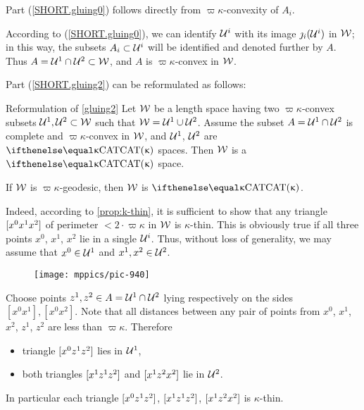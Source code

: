 Part (\ref{SHORT.gluing0})
follows directly from $\varpi\kappa$-convexity of $A_i$.

According to (\ref{SHORT.gluing0}),
we can identify $\mathcal{U}^i$ with its image $\jmath_i(\mathcal{U}^i)$ in $\mathcal{W}$;
in this way, the subsets $A_i\subset \spc{U}^i$ will be identified and denoted further by $A$.
Thus   $A=\spc{U}^1\cap \spc{U}^2\subset \spc{W}$,
and $A$ is $\varpi\kappa$-convex in $\mathcal{W}$.

Part (\ref{SHORT.gluing2}) can be reformulated as follows:

\begin{thm}{Reformulation of \ref{gluing2}}
Let $\mathcal{W}$ be a 
length space having two 
$\varpi\kappa$-convex subsets $\spc{U}^1,\spc{U}^2\subset\spc{W}$ such that
$\spc{W}=\spc{U}^1\cup\spc{U}^2$.
Assume the subset $A=\spc{U}^1\cap \spc{U}^2$ is complete and $\varpi\kappa$-convex in $\mathcal{W}$, and $\mathcal{U}^1$, $\mathcal{U}^2$ are $\CAT\kappa$ spaces.
Then $\mathcal{W}$ is a $\CAT\kappa$ space.
\end{thm}

\begin{clm}{}\label{clm:geod-gluing}
If $\mathcal{W}$ is $\varpi\kappa$-geodesic, then $\mathcal{W}$ is $\CAT\kappa$.
\end{clm}

Indeed, 
according to \ref{prop:k-thin},
it is sufficient to show that any triangle $[{x^0}{x^1}{x^2}]$ of perimeter $<2\cdot \varpi\kappa$ 
in $\mathcal{W}$ is $\kappa$-thin.
This is obviously true if all three points $x^0$, $x^1$, $x^2$ lie in a single $\mathcal{U}^i$.
Thus, without loss of generality, we may assume that $x^0\in\spc{U}^1$ and $x^1,x^2\in\spc{U}^2$.
\begin{figure}[!ht]
\vskip-0mm
\centering
\texttt{[image: mppics/pic-940]}
\end{figure}

Choose points $z^1,z^2\in A=\spc{U}^1\cap\spc{U}^2$ 
lying respectively on the sides $[x^0x^1], [x^0x^2]$.
Note that all distances between any pair of points from $x^0$, $x^1$, $x^2$, $z^1$, $z^2$ are less than $\varpi\kappa$.
Therefore
\begin{itemize}
\item triangle $[{x^0}{z^1}{z^2}]$ lies in $\mathcal{U}^1$,
\item both triangles $[{x^1}{z^1}{z^2}]$ and $[{x^1}{z^2}{x^2}]$ lie in $\mathcal{U}^2$.
\end{itemize}
In particular each triangle $[{x^0}{z^1}{z^2}]$,
$[{x^1}{z^1}{z^2}]$, $[{x^1}{z^2}{x^2}]$ is $\kappa$-thin.

